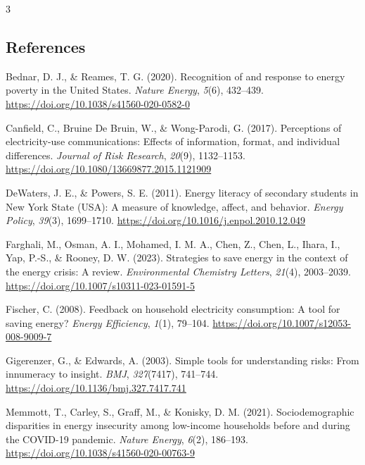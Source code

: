 \documentclass[
  12pt,
]{article}
\newlength{\cslhangindent}
\newenvironment{CSLReferences}[2] %
 {\begin{list}{}{%
  \setlength{\itemindent}{0pt}
  \setlength{\leftmargin}{0pt}
  \setlength{\parsep}{0pt}
  \ifodd #1
   \setlength{\leftmargin}{\cslhangindent}
   \setlength{\itemindent}{-1\cslhangindent}
  \fi
  \setlength{\itemsep}{#2\baselineskip}}}
 {\end{list}}
\begin{document}
\begin{multicols}{3}
\subsection{References}\label{references}

\label{refs}
\begin{CSLReferences}{1}{0}
Bednar, D. J., \& Reames, T. G. (2020). Recognition of and response to
energy poverty in the {United States}. \emph{Nature Energy},
\emph{5}(6), 432--439. \url{https://doi.org/10.1038/s41560-020-0582-0}

Canfield, C., Bruine De Bruin, W., \& Wong-Parodi, G. (2017).
Perceptions of electricity-use communications: Effects of information,
format, and individual differences. \emph{Journal of Risk Research},
\emph{20}(9), 1132--1153.
\url{https://doi.org/10.1080/13669877.2015.1121909}

DeWaters, J. E., \& Powers, S. E. (2011). Energy literacy of secondary
students in {New York State} ({USA}): {A} measure of knowledge, affect,
and behavior. \emph{Energy Policy}, \emph{39}(3), 1699--1710.
\url{https://doi.org/10.1016/j.enpol.2010.12.049}

Farghali, M., Osman, A. I., Mohamed, I. M. A., Chen, Z., Chen, L.,
Ihara, I., Yap, P.-S., \& Rooney, D. W. (2023). Strategies to save
energy in the context of the energy crisis: A review.
\emph{Environmental Chemistry Letters}, \emph{21}(4), 2003--2039.
\url{https://doi.org/10.1007/s10311-023-01591-5}

Fischer, C. (2008). Feedback on household electricity consumption: A
tool for saving energy? \emph{Energy Efficiency}, \emph{1}(1), 79--104.
\url{https://doi.org/10.1007/s12053-008-9009-7}

Gigerenzer, G., \& Edwards, A. (2003). Simple tools for understanding
risks: From innumeracy to insight. \emph{BMJ}, \emph{327}(7417),
741--744. \url{https://doi.org/10.1136/bmj.327.7417.741}

Memmott, T., Carley, S., Graff, M., \& Konisky, D. M. (2021).
Sociodemographic disparities in energy insecurity among low-income
households before and during the {COVID-19} pandemic. \emph{Nature
Energy}, \emph{6}(2), 186--193.
\url{https://doi.org/10.1038/s41560-020-00763-9}


\end{CSLReferences}
\end{multicols}
\end{document}
